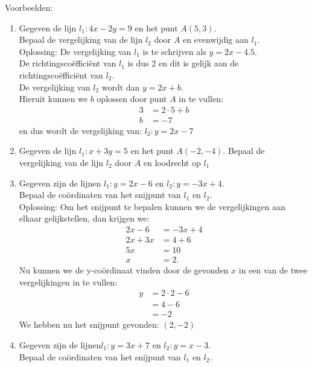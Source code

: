 Voorbeelden:
\begin{enumerate}
    \itemsep1em
    \item Gegeven de lijn $l_1:4x-2y=9$ en het punt $A(5,3)$. \\
          Bepaal de vergelijking van de lijn $l_2$ door $A$ en evenwijdig aan $l_1$.\\ 

          Oplossing: De vergelijking van $l_1$ is te schrijven als $y=2x-4.5$.\\
          De richtingsco\"effici\"ent van $l_1$ is dus $2$ en dit is gelijk aan de richtingsco\"effici\"ent van $l_2$. \\
          De vergelijking van $l_2$ wordt dan $y=2x+b$. \\
          Hieruit kunnen we $b$ oplossen door punt $A$ in te vullen: 
          \begin{align*}
            3&=2\cdot 5+b \\
            b&=-7 
          \end{align*}
          en dus wordt de vergelijking van: $l_2:y=2x-7$

    \item Gegeven de lijn $l_1:x+3y=5$ en het punt $A(-2,-4)$.
          Bepaal de vergelijking van de lijn $l_2$ door $A$ en loodrecht op $l_1$

    \item Gegeven zijn de lijnen $l_1:y=2x-6$ en $l_2:y=-3x+4$. \\
          Bepaal de co\"ordinaten van het snijpunt van $l_1$ en $l_2$. \\
          Oplossing: Om het snijpunt te bepalen kunnen we de vergelijkingen aan elkaar gelijkstellen, dan krijgen we: 
          \begin{align*}
            2x-6&=-3x+4 \\
            2x+3x&=4+6 \\
            5x&=10 \\
            x&=2.
          \end{align*}
            Nu kunnen we de y-co\"ordinaat vinden door de gevonden $x$ in een van de twee vergelijkingen in te vullen: 
            \begin{align*}
                y&=2\cdot 2-6 \\
                 &=4-6 \\
                 &=-2
            \end{align*}
            We hebben nu het snijpunt gevonden: $(2,-2)$

    \item Gegeven zijn de lijnen$ l_1:y=3x+7$ en $l_2:y=x-3$. \\
          Bepaal de co\"ordinaten van het snijpunt van $l_1$ en $l_2$.
\end{enumerate}

